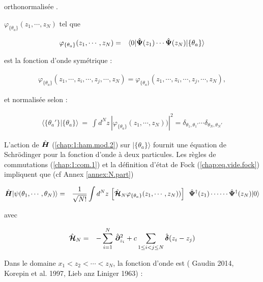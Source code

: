 orthonormalisée .


 \(\varphi_{\{\theta_a\}}(z_1, \cdots ,  z_N)\) tel que 

\begin{eqnarray}
	\varphi_{\{\theta_a\}}(z_1, \cdots ,  z_N) & = & 	\langle 0 \vert  \hat{\bm{\Psi}}(z_1) \cdots  \hat{\bm{\Psi}}(z_N)\vert  \{\theta_a\}  \rangle 
\end{eqnarray}


est la fonction d’onde symétrique :

\begin{eqnarray}
	\varphi_{\{\theta_a\}}(z_1, \cdots ,z_i , \cdots , z_j,  \cdots ,  z_N) = \varphi_{\{\theta_a\}}(z_1, \cdots ,z_i , \cdots , z_j,  \cdots ,  z_N),
\end{eqnarray}

et normalisée selon :

\begin{eqnarray}
	\langle \{\theta_a'\} \vert \{\theta_a\} \rangle ~=~ \int d^Nz\,  |\varphi_{\{\theta_a\}}(z_1, \cdots ,  z_N))|^2 = \delta_{\theta_1,\theta_1'} \cdots \delta_{\theta_N,\theta_N'}
\end{eqnarray}

L’action de \(\hat{\bm{H}}\) (\ref{chap:1:ham.mod.2}) sur \(\vert \{\theta_a\} \rangle\) fournit une équation de Schrödinger pour la fonction d’onde à deux particules. Les règles de commutations (\ref{chap:1:com.1}) et la définition d'état de Fock (\ref{chap:eq.vide.fock}) impliquent que (cf Annex \ref{annex:N.part})

%



\begin{eqnarray}
	\operator{H}\vert \psi ( \theta_1 , \cdots , \theta_N ) \rangle &= &  \frac{1}{ \sqrt{N!}} \int d^N z \,  	\left [ \operator{\mathcal{H}}_N \varphi_{\{\theta_a\}}(z_1, \cdots ,  z_N)) \right ] \, \operator{\Psi}^\dag(z_1) \cdots  \cdots\operator{\Psi}^\dag(z_N) \vert 0 \rangle		
\end{eqnarray}

avec 

\begin{eqnarray}
	\hat{\bm{\mathcal{H}}}_N & = &  - \sum_{i=1}^N \, \hat{\bm{\partial}}_{z_i}^2 + 	c \sum_{1\leq i<j\leq N} \hat{\bm{\delta}}(z_i - z_j) 		
\end{eqnarray}


Dans le domaine $x_1 < z_2 < \cdots < z_N$, la fonction d'onde est ({\color{blue} Gaudin 2014}, {\color{blue}Korepin et al. 1997}, {\color{blue}Lieb anz Liniger 1963}) :

